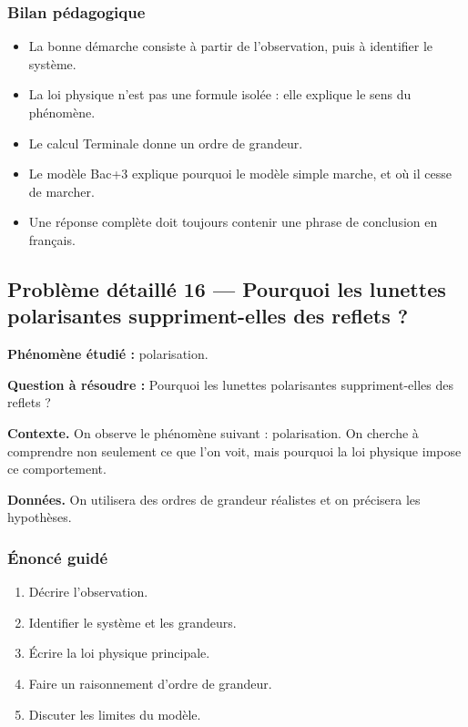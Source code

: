 \documentclass[11pt,a4paper]{article}
\begin{document}
\subsubsection*{Bilan pédagogique}

\begin{methodebox}
\begin{itemize}
  \item La bonne démarche consiste à partir de l'observation, puis à identifier le système.
  \item La loi physique n'est pas une formule isolée : elle explique le sens du phénomène.
  \item Le calcul Terminale donne un ordre de grandeur.
  \item Le modèle Bac+3 explique pourquoi le modèle simple marche, et où il cesse de marcher.
  \item Une réponse complète doit toujours contenir une phrase de conclusion en français.
\end{itemize}
\end{methodebox}

\subsection{Problème détaillé 16 — Pourquoi les lunettes polarisantes suppriment-elles des reflets ?}

\begin{exercicebox}
\textbf{Phénomène étudié :} polarisation.

\medskip
\textbf{Question à résoudre :} Pourquoi les lunettes polarisantes suppriment-elles des reflets ?

\medskip
\textbf{Contexte.} On observe le phénomène suivant : polarisation. On cherche à comprendre non seulement ce que l'on voit, mais pourquoi la loi physique impose ce comportement.

\medskip
\textbf{Données.} On utilisera des ordres de grandeur réalistes et on précisera les hypothèses.
\end{exercicebox}

\subsubsection*{Énoncé guidé}

\begin{enumerate}
  \item Décrire l'observation.
  \item Identifier le système et les grandeurs.
  \item Écrire la loi physique principale.
  \item Faire un raisonnement d'ordre de grandeur.
  \item Discuter les limites du modèle.
\end{enumerate}
\end{document}
